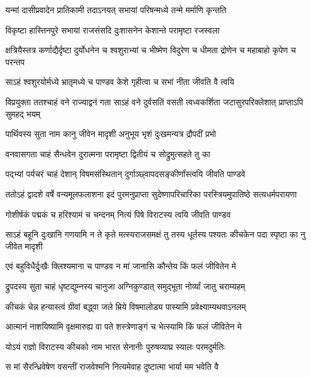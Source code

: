 \twolineshloka
{यन्मां दासीप्रवादेन प्रातिकामी तदाऽनयत्}
{सभायां परिषन्मध्ये तन्मे मर्माणि कृन्तति}


\twolineshloka
{विकृष्टा हास्तिनपुरे सभायां राजसंसदि}
{दुःशासनेन केशान्ते परामृष्टा रजस्वला}


\threelineshloka
{क्षत्रियैस्तत्र कर्णाद्यैर्दृष्टा दुर्योधनेन च}
{श्वशुराभ्यां च भीष्मेण विदुरेण च धीमता}
{द्रोणेन च महाबाहो कृपेण च परन्तप}


\twolineshloka
{साऽहं श्वशुरयोर्मध्ये भ्रातृमध्ये च पाण्डव}
{केशे गृहीत्वा च सभां नीता जीवति वै त्वयि}


\threelineshloka
{विप्रयुक्ता ततश्चाहं वने राज्याद्वनं गता}
{साऽहं वने दुर्वसतिं वसती त्वध्वकर्शिता}
{जटासुरपरिक्लेशात् प्राप्ताऽपि सुमहद् भयम्}


\twolineshloka
{पार्थिवस्य सुता नाम कानु जीवेन मादृशी}
{अनुभूय भृशं दुःखमन्यत्र द्रौपदीं प्रभो}


\twolineshloka
{वनवासगता चाहं सैन्धवेन दुरात्मना}
{परामृष्टा द्वितीयं च सोद्रुमुत्सहते तु का}


\twolineshloka
{पद्भ्यां पर्यचरं चाहं देशान् विषमसंस्थितान्}
{दुर्गाञ्छ्वापदसङ्कीर्णांस्त्वयि जीवति पाण्डवे}


\threelineshloka
{ततोऽहं द्वादशे वर्षे वन्यमूलफलाशना}
{इदं पुरमनुप्राप्ता सुदेष्णापरिचारिका}
{परस्त्रियमुपातिष्ठे सत्यधर्मपरायणा}


\twolineshloka
{गोशीर्षकं पद्मकं च हरिश्यामं च चन्दनम्}
{नित्यं पिषे विराटस्य त्वयि जीवति पाण्डव}


\onelineshloka
{साऽहं बहूनि दुःखानि गणयामि न ते कृते}
\twolineshloka
{मत्स्यराजसमक्षं तु तस्य धूर्तस्य पश्यतः}
{कीचकेन पदा स्पृष्टा का नु जीवेत मादृशी}


\twolineshloka
{एवं बहुविधैर्दुःखैः क्लिश्यमाना च पाण्डव}
{न मां जानासि कौन्तेय किं फलं जीवितेन मे}


\twolineshloka
{द्रुपदस्य सुता चाहं धृष्टद्युम्नस्य चानुजा}
{अग्निकुण्डात् समुद्भूता नोर्व्यां जातु चराम्यहम्}


\twolineshloka
{कीचकं चेन्न हन्यास्त्वं ग्रीवां बद्ध्वा जले म्रिये}
{विषमालोड्य पास्यामि प्रवेक्ष्याम्यथवाऽनलम्}


\twolineshloka
{आत्मानं नाशयिष्यामि वृक्षमारुह्य वा पते}
{शस्त्रेणाङ्गं च भेत्स्यामि किं फलं जीवितेन मे}


\twolineshloka
{योऽयं राज्ञो विराटस्य कीचको नाम भारत}
{सेनानीः पुरुषव्याघ्र स्यालः परमदुर्मतिः}


\twolineshloka
{स मां सैरन्ध्रिवेषेण वसन्तीं राजवेश्मनि}
{नित्यमेवाह दुष्टात्मा भार्या मम भवेति वै}



